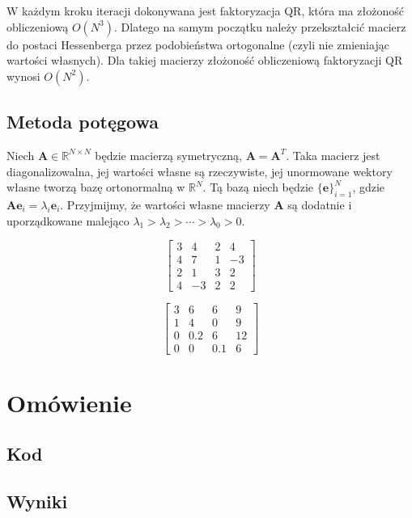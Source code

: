\documentclass[a4paper,11pt]{article}
\begin{document}
W każdym kroku iteracji dokonywana jest faktoryzacja QR, która ma złożoność
obliczeniową \(O(N^3)\). Dlatego na samym początku należy przekształcić macierz
do postaci Hessenberga przez podobieństwa ortogonalne (czyli nie zmieniając
wartości własnych). Dla takiej macierzy złożoność obliczeniową faktoryzacji QR
wynosi \(O(N^2)\).

\subsection{Metoda potęgowa}

Niech \(\mathbf{A} \in \mathbb{R}^{N\times N} \) będzie macierzą symetryczną,
\(\mathbf{A=A}^T\). Taka macierz jest diagonalizowalna, jej wartości własne
są rzeczywiste, jej unormowane wektory własne tworzą bazę ortonormalną
w \(\mathbb{R}^N\). Tą bazą niech będzie \( \{\mathbf{e}\} ^N_{i=1} \),
gdzie \(\mathbf{Ae}_i = \lambda_i\mathbf{e}_i\). Przyjmijmy, że wartości własne
macierzy \(\mathbf{A}\) są dodatnie i uporządkowane malejąco 
\(\lambda_1 > \lambda_2 > \cdots > \lambda_0 > 0\).


\[
\begin{bmatrix}
    3 & 4 & 2 & 4 \\
    4 & 7 & 1 & -3 \\
    2 & 1 & 3 & 2 \\
    4 & -3 & 2 & 2
\end{bmatrix}
\]

\[
\begin{bmatrix}
    3 & 6 & 6 & 9 \\
    1 & 4 & 0 & 9 \\
    0 & 0.2 & 6 & 12 \\
    0 & 0 & 0.1 & 6
\end{bmatrix}
\]

\section{Omówienie}

\subsection{Kod}


\subsection{Wyniki}
\end{document}
